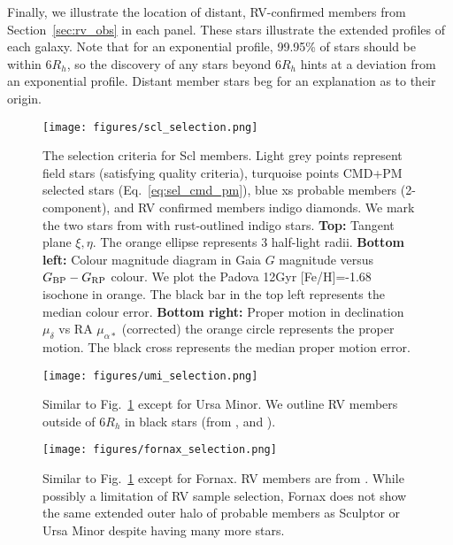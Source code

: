 Finally, we illustrate the location of distant, RV-confirmed members
from Section~\ref{sec:rv_obs} in each panel. These stars illustrate the
extended profiles of each galaxy. Note that for an exponential profile,
99.95\% of stars should be within \(6R_h\), so the discovery of any
stars beyond \(6R_h\) hints at a deviation from an exponential profile.
Distant member stars beg for an explanation as to their origin.

\begin{figure}
\centering
\texttt{[image: figures/scl\_selection.png]}
\caption[Sculptor sample selection]{The selection criteria for Scl
members. Light grey points represent field stars (satisfying quality
criteria), turquoise points CMD+PM selected stars
(Eq.~\ref{eq:sel_cmd_pm}), blue xs probable members (2-component), and
RV confirmed members indigo diamonds. We mark the two stars from
\citet{sestito+2023a} with rust-outlined indigo stars. \textbf{Top:}
Tangent plane \(\xi, \eta\). The orange ellipse represents 3 half-light
radii. \textbf{Bottom left:} Colour magnitude diagram in Gaia \(G\)
magnitude versus \(G_{\rm BP} - G_{\rm RP}\) colour. We plot the Padova
12Gyr {[}Fe/H{]}=-1.68 isochone in orange. The black bar in the top left
represents the median colour error. \textbf{Bottom right:} Proper motion
in declination \(\mu_\delta\) vs RA \(\mu_{\alpha*}\) (corrected) the
orange circle represents the \citet{MV2020b} proper motion. The black
cross represents the median proper motion
error.}\label{fig:scl_selection}
\end{figure}

\begin{figure}
\centering
\texttt{[image: figures/umi\_selection.png]}
\caption[Ursa Minor sample selection]{Similar to
Fig.~\ref{fig:scl_selection} except for Ursa Minor. We outline RV
members outside of \(6R_h\) in black stars (from \citet{sestito+2023b},
\citet{pace+2020} and \citet{spencer+2018}).}\label{fig:umi_selection}
\end{figure}

\begin{figure}
\centering
\texttt{[image: figures/fornax\_selection.png]}
\caption[Fornax sample selection]{Similar to
Fig.~\ref{fig:scl_selection} except for Fornax. RV members are from
\citet{WMO2009}. While possibly a limitation of RV sample selection,
Fornax does not show the same extended outer halo of probable members as
Sculptor or Ursa Minor despite having many more
stars.}\label{fig:fornax_selection}
\end{figure}

